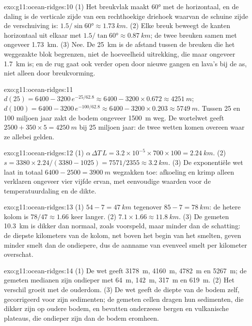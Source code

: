 \begin{solution}{exo:g11:ocean-ridges:10}
(1) Het breukvlak maakt \ang{60} met de horizontaal, en de daling is de
verticale zijde van een rechthoekige driehoek waarvan de schuine zijde de verschuiving is:
$1.5/\sin\ang{60} \approx \qty{1.73}{km}$. (2) Elke breuk beweegt de kanten
horizontaal uit elkaar met $1.5/\tan\ang{60} \approx \qty{0.87}{km}$; de twee
breuken samen met ongeveer \qty{1.73}{km}. (3) Nee. De \qty{25}{km} is de
afstand tussen de breuken die het weggezakte blok begrenzen, niet de hoeveelheid
uitrekking, die maar ongeveer \qty{1.7}{km} is; en de rug gaat ook verder open
door nieuwe gangen en lava's bij de as, niet alleen door breukvorming.
\end{solution}

\begin{solution}{exo:g11:ocean-ridges:11}
$d(25) = 6400 - 3200\,e^{-25/62.8} \approx 6400 - 3200 \times 0.672 \approx
\qty{4251}{m}$; $d(100) = 6400 - 3200\,e^{-100/62.8} \approx 6400 - 3200
\times 0.203 \approx \qty{5749}{m}$. Tussen 25 en 100 miljoen jaar zakt de
bodem ongeveer \qty{1500}{m} weg. De wortelwet geeft
$2500 + 350 \times 5 = \qty{4250}{m}$ bij 25 miljoen jaar: de twee wetten
komen overeen waar ze allebei gelden.
\end{solution}

\begin{solution}{exo:g11:ocean-ridges:12}
(1) $\alpha\,\Delta T\,L = 3.2 \times 10^{-5} \times 700 \times 100 =
\qty{2.24}{km}$. (2) $s = 3380 \times 2.24/(3380 - 1025) = 7571/2355 \approx
\qty{3.2}{km}$. (3) De exponentiële wet laat in totaal $6400 - 2500 =
\qty{3900}{m}$ wegzakken toe: afkoeling en krimp alleen verklaren ongeveer
vier vijfde ervan, met eenvoudige waarden voor de temperatuurdaling en de
dikte.
\end{solution}

\begin{solution}{exo:g11:ocean-ridges:13}
(1) $54 - 7 = \qty{47}{km}$ tegenover $85 - 7 = \qty{78}{km}$: de hetere
kolom is $78/47 \approx 1.66$ keer langer. (2) $7.1 \times 1.66 \approx
\qty{11.8}{km}$. (3) De gemeten \qty{10.3}{km} is dikker dan normaal, zoals
voorspeld, maar minder dan de schatting: de diepste kilometers van de kolom,
net boven het begin van het smelten, geven minder smelt dan de ondiepere, dus
de aanname van evenveel smelt per kilometer overschat.
\end{solution}

\begin{solution}{exo:g11:ocean-ridges:14}
(1) De wet geeft \qty{3178}{m}, \qty{4160}{m}, \qty{4782}{m} en
\qty{5267}{m}; de gemeten medianen zijn ondieper met \qty{64}{m},
\qty{142}{m}, \qty{317}{m} en \qty{619}{m}. (2) Het verschil groeit met de
ouderdom. (3) De wet geeft de diepte van de bodem zelf, gecorrigeerd voor zijn
sedimenten; de gemeten cellen dragen hun sedimenten, die dikker zijn op
oudere bodem, en bevatten onderzeese bergen en vulkanische plateaus, die
ondieper zijn dan de bodem eromheen.
\end{solution}

